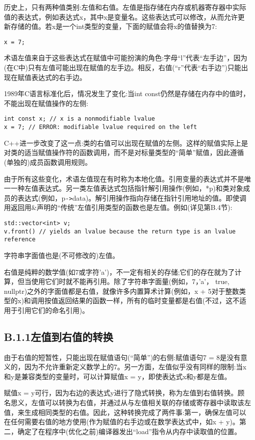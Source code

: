 
历史上，只有两种值类别:左值和右值。左值是指存储在内存或机器寄存器中实际值的表达式，例如表达式x，其中x是变量名。这些表达式可以修改，从而允许更新存储的值。若x是一个int类型的变量，下面的赋值会将x的值替换为7:

\begin{lstlisting}[style=styleCXX]
x = 7;
\end{lstlisting}

术语左值来自于这些表达式在赋值中可能扮演的角色:字母“l”代表“左手边”，因为(在C中)只有左值可能出现在赋值的左手边。相反，右值(“r”代表“右手边”)只能出现在赋值表达式的右手边。

1989年C语言标准化后，情况发生了变化:当int const仍然是存储在内存中的值时，不能出现在赋值操作的左侧:

\begin{lstlisting}[style=styleCXX]
int const x; // x is a nonmodifiable lvalue
x = 7; // ERROR: modifiable lvalue required on the left
\end{lstlisting}

C++进一步改变了这一点:类的右值可以出现在赋值的左侧。这样的赋值实际上是对类的适当赋值操作符的函数调用，而不是对标量类型的“简单”赋值，因此遵循(单独的)成员函数调用规则。

由于所有这些变化，术语左值现在有时称为本地化值。引用变量的表达式并不是唯一一种左值表达式。另一类左值表达式包括指针解引用操作(例如，*p)和类对象成员的表达式(例如，p\texttt{->}data)。解引用操作指向存储在指针引用地址的值。即使调用返回用\&声明的“传统”左值引用类型的函数也是左值。例如(详见第B.4节):

\begin{lstlisting}[style=styleCXX]
std::vector<int> v;
v.front() // yields an lvalue because the return type is an lvalue reference
\end{lstlisting}

字符串字面值也是(不可修改的)左值。

右值是纯粹的数学值(如7或字符'a')，不一定有相关的存储;它们的存在就为了计算，但当使用它们时就不能再引用。除了字符串字面量(例如，7，'a'， true, nullptr)之外的字面值都是右值，就像许多内置算术计算(例如，x + 5对于整数类型的x)和调用按值返回结果的函数一样，所有的临时变量都是右值(不过，这不适用于引用它们的命名引用)。

\subsection{B.1.1\hspace{0.2cm}左值到右值的转换}

由于右值的短暂性，只能出现在赋值语句(“简单”)的右侧:赋值语句7 = 8是没有意义的，因为不允许重新定义数学上的7。另一方面，左值似乎没有同样的限制:当x和y是兼容类型的变量时，可以计算赋值x = y，即使表达式x和y都是左值。

赋值x = y可行，因为右边的表达式y进行了隐式转换，称为左值到右值转换。顾名思义，左值可以转换为右值，并通过从与左值相关联的存储或寄存器中读取该左值，来生成相同类型的右值。因此，这种转换完成了两件事:第一，确保左值可以在任何需要右值的地方使用(作为赋值的右手边或在数学表达式中，如x + y)。第二，确定了在程序中(优化之前)编译器发出“load”指令从内存中读取值的位置。


















